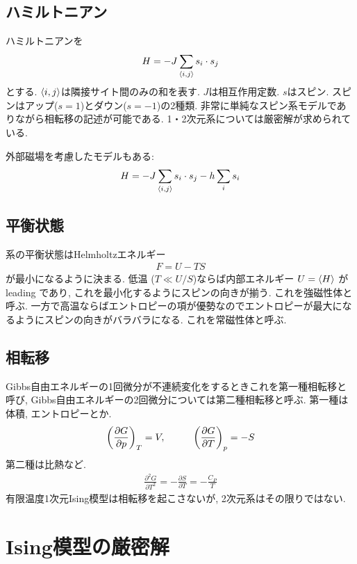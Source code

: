 \documentclass[10.5pt,a4paper]{jreport}
\begin{document}
\subsection{ハミルトニアン}
ハミルトニアンを
\begin{eqnarray}
  H = -J\sum_{\ev{i, j}}s_i\cdot s_j
\end{eqnarray}
とする. $\ev{i, j}$は隣接サイト間のみの和を表す. $J$は相互作用定数. $s$はスピン. スピンはアップ($s = 1$)とダウン($s = -1$)の2種類. 非常に単純なスピン系モデルでありながら相転移の記述が可能である. 1・2次元系については厳密解が求められている.

外部磁場を考慮したモデルもある:
\begin{eqnarray}
  H = -J\sum_{\ev{i, j}}s_i\cdot s_j -h\sum_i s_i\label{Ising2}
\end{eqnarray}

\subsection{平衡状態}
系の平衡状態はHelmholtzエネルギー
\begin{eqnarray}
  F = U -TS
\end{eqnarray}
が最小になるように決まる. 低温 ($T \ll U/S$)ならば内部エネルギー $U = \ev{H}$ がleading であり, これを最小化するようにスピンの向きが揃う. これを強磁性体と呼ぶ. 一方で高温ならばエントロピーの項が優勢なのでエントロピーが最大になるようにスピンの向きがバラバラになる. これを常磁性体と呼ぶ.

\subsection{相転移}
Gibbs自由エネルギーの1回微分が不連続変化をするときこれを第一種相転移と呼び, Gibbs自由エネルギーの2回微分については第二種相転移と呼ぶ. 第一種は体積, エントロピーとか. 
\begin{eqnarray}
  \qty(\frac{\partial G}{\partial p})_T = V, \hspace{1cm} \qty(\frac{\partial G}{\partial T})_p = -S
\end{eqnarray}
第二種は比熱など.
\begin{eqnarray}
\frac{\partial^2 G}{\partial T^2} = -\frac{\partial S}{\partial T} = -\frac{C_P}{T}
\end{eqnarray}
有限温度1次元Ising模型は相転移を起こさないが, 2次元系はその限りではない.

\section{Ising模型の厳密解}
\end{document}
